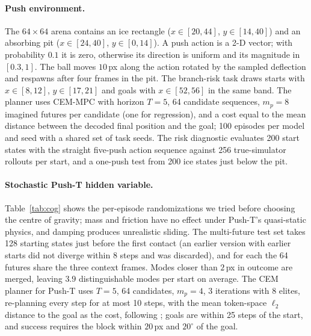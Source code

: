\paragraph{Push environment.}
The $64\times64$ arena contains an ice rectangle ($x \in [20, 44]$, $y \in [14, 40]$) and an absorbing pit ($x \in [24, 40]$, $y \in [0, 14]$). A push action is a 2-D vector; with probability $0.1$ it is zero, otherwise its direction is uniform and its magnitude in $[0.3, 1]$. The ball moves $10$\,px along the action rotated by the sampled deflection and respawns after four frames in the pit. The branch-risk task draws starts with $x \in [8, 12]$, $y \in [17, 21]$ and goals with $x \in [52, 56]$ in the same band. The planner uses CEM-MPC with horizon $T{=}5$, 64 candidate sequences, $m_p{=}8$ imagined futures per candidate (one for regression), and a cost equal to the mean distance between the decoded final position and the goal; 100 episodes per model and seed with a shared set of task seeds. The risk diagnostic evaluates 200 start states with the straight five-push action sequence against 256 true-simulator rollouts per start, and a one-push test from 200 ice states just below the pit.

\paragraph{Stochastic Push-T hidden variable.}
Table~\ref{tab:cog} shows the per-episode randomizations we tried before choosing the centre of gravity; mass and friction have no effect under Push-T's quasi-static physics, and damping produces unrealistic sliding. The multi-future test set takes 128 starting states just before the first contact (an earlier version with earlier starts did not diverge within 8 steps and was discarded), and for each the 64 futures share the three context frames. Modes closer than $2$\,px in outcome are merged, leaving $3.9$ distinguishable modes per start on average. The CEM planner for Push-T uses $T{=}5$, 64 candidates, $m_p{=}4$, 3 iterations with 8 elites, re-planning every step for at most 10 steps, with the mean token-space $\ell_2$ distance to the goal as the cost, following \citet{terver2025drives}; goals are within 25 steps of the start, and success requires the block within $20$\,px and $20^\circ$ of the goal.

